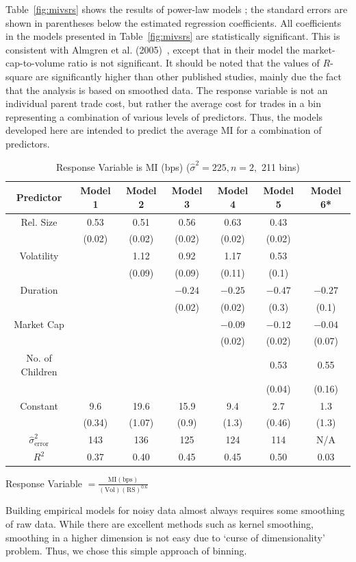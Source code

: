 Table~\ref{fig:mivsrs} shows the results of power-law models ; the standard errors are shown in parentheses below the estimated regression coefficients. All coefficients in the models presented in Table~\ref{fig:mivsrs} are statistically significant. This is consistent with Almgren et al. (2005)~\cite{athl}, except that in their model the market-cap-to-volume ratio is not significant. It should be noted that the values of $R$-square are significantly higher than other published studies, mainly due the fact that the analysis is based on smoothed data. The response variable is not an individual parent trade cost, but rather the average cost for trades in a bin representing a combination of various levels of predictors. Thus, the models developed here are intended to predict the average MI for a combination of predictors.
        \begin{table}[!ht]
        \caption{Response Variable is MI (bps) ($\hat{\sigma}^2=225, n=2,$ 211 bins) \label{tab:responsevarmi}}
        \begin{tabular}{|c|c|c|c|c|c|c|}
        Predictor & Model 1& Model 2 & Model 3 & Model 4 & Model 5 & Model 6* \\ \hline
        Rel. Size & 0.53 & 0.51 & 0.56 & 0.63 & 0.43 & \\
        	& (0.02) & (0.02) & (0.02) & (0.02) & (0.02) & \\
        Volatility & & 1.12 & 0.92 & 1.17 & 0.53 & \\
        	& & (0.09) & (0.09) & (0.11) & (0.1) & \\
        Duration	& & & $-0.24$ & $-0.25$ & $-0.47$ & $-0.27$ \\
        	& & & (0.02) & (0.02) & (0.3) & (0.1) \\
        Market Cap & & & & $-0.09$ & $-0.12$ & $-0.04$ \\
        	& & & & (0.02) & (0.02) & (0.07) \\
        No. of Children & & & & & 0.53 & 0.55 \\
        	& & & & & (0.04) & (0.16) \\
        Constant & 9.6 & 19.6 & 15.9 & 9.4 & 2.7 & 1.3 \\
        	& (0.34) & (1.07) & (0.9) & (1.3) & (0.46) & (1.3) \\ \hline
        $\hat{\sigma}_{\text{error}}^2$ & 143 & 136 & 125 & 124 & 114 & N/A \\
        $R^2$ & 0.37 & 0.40 & 0.45 & 0.45 & 0.50 & 0.03 \\
        \end{tabular}
        {\small*Response Variable $= \frac{\text{MI}(\text{bps})}{(\text{Vol})(\text{RS})^{0.6}}$}
        \end{table}
Building empirical models for noisy data almost always requires some smoothing of raw data. While there are excellent methods such as kernel smoothing, smoothing in a higher dimension is not easy due to `curse of dimensionality' problem. Thus, we chose this simple approach of binning. 


